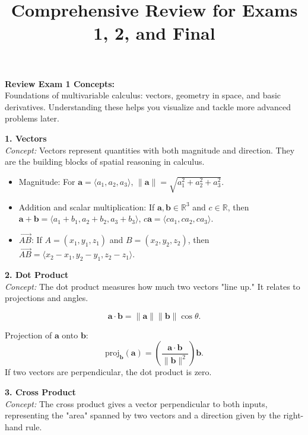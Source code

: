 \documentclass[9pt]{article}
\title{\footnotesize \textbf{Comprehensive Review for Exams 1, 2, and Final}}
\date{}
\begin{document}
\maketitle
\vspace{-15pt}

\begin{multicols}{2}
\footnotesize

\noindent \textbf{Review Exam 1 Concepts:}\\
Foundations of multivariable calculus: vectors, geometry in space, and basic derivatives. Understanding these helps you visualize and tackle more advanced problems later.

\begin{tcolorbox}[title=, colframe=brightblue]
\textbf{1. Vectors}\\
\textit{Concept:} Vectors represent quantities with both magnitude and direction. They are the building blocks of spatial reasoning in calculus.

\begin{itemize}
    \item Magnitude: For $\mathbf{a}=\langle a_1,a_2,a_3\rangle$, $\|\mathbf{a}\|=\sqrt{a_1^2+a_2^2+a_3^2}$.
    \item Addition and scalar multiplication: If $\mathbf{a},\mathbf{b}\in\mathbb{R}^3$ and $c\in\mathbb{R}$, then $\mathbf{a}+\mathbf{b}=\langle a_1+b_1,a_2+b_2,a_3+b_3\rangle$, $c\mathbf{a}=\langle ca_1,ca_2,ca_3\rangle$.
    \item $\overrightarrow{AB}$: If $A=(x_1,y_1,z_1)$ and $B=(x_2,y_2,z_2)$, then $\overrightarrow{AB}=\langle x_2 - x_1, y_2 - y_1, z_2 - z_1\rangle$.
\end{itemize}
\end{tcolorbox}

\begin{tcolorbox}[title=, colframe=brightgreen]
\textbf{2. Dot Product}\\
\textit{Concept:} The dot product measures how much two vectors "line up." It relates to projections and angles.

\[
\mathbf{a}\cdot \mathbf{b}=\|\mathbf{a}\|\|\mathbf{b}\|\cos\theta.
\]

Projection of $\mathbf{a}$ onto $\mathbf{b}$:
\[
\text{proj}_{\mathbf{b}}(\mathbf{a})=\left(\frac{\mathbf{a}\cdot\mathbf{b}}{\|\mathbf{b}\|^2}\right)\mathbf{b}.
\]
If two vectors are perpendicular, the dot product is zero.
\end{tcolorbox}

\begin{tcolorbox}[title=, colframe=brightpink]
\textbf{3. Cross Product}\\
\textit{Concept:} The cross product gives a vector perpendicular to both inputs, representing the "area" spanned by two vectors and a direction given by the right-hand rule.


\end{tcolorbox}
\end{multicols}
\end{document}
